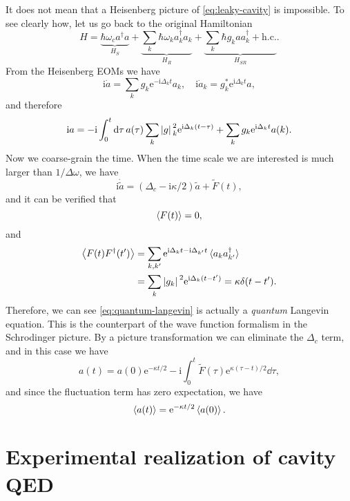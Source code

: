 \documentclass[hyperref, a4paper]{article}
\newcommand*{\ii}{\mathrm{i}}
\newcommand*{\ee}{\mathrm{e}}
\begin{document}
It does not mean that a Heisenberg picture of \eqref{eq:leaky-cavity} is impossible. To see clearly how, 
let us go back to the original Hamiltonian 
\begin{equation}
    H = \underbrace{\hbar \omega_c a^\dagger a}_{H_S} + \underbrace{\sum_k \hbar \omega_k a^\dagger_k a_k}_{H_R} + \underbrace{\sum_k \hbar g_k a a_k^\dagger + \text{h.c.}}_{H_{SR}}.
\end{equation}
From the Heisenberg EOMs we have 
\[
    \ii \dot{a} = \sum_k g_k \ee^{- \ii \Delta_k t} a_k, \quad \ii \dot{a}_k = g_k^* \ee^{\ii \Delta_k t} a,
\]
and therefore 
\[
    \ii a = - \ii \int_0^t \dd{\tau} a(\tau) \sum_k \abs*{g}_k^2 \ee^{\ii \Delta_k (t - \tau)}
    + \sum_k g_k \ee^{\ii \Delta_k t} a(k).
\]
Now we coarse-grain the time. When the time scale we are interested is much larger than $1 / \Delta \omega$,
we have 
\begin{equation}
    \ii \dot{\tilde{a}} = (\Delta_c - \ii \kappa / 2) \tilde{a} + \tilde{F}(t),
    \label{eq:quantum-langevin}
\end{equation}
and it can be verified that 
\begin{equation}
    \expval{F(t)} = 0, 
\end{equation}
and 
\begin{equation}
    \begin{aligned}
        \expval{F(t) F^\dagger(t')} &= \sum_{k, k'} \ee^{\ii \Delta_k t - \ii \Delta_{k'} t} \expval*{a_k a^\dagger_{k'}} \\
        &= \sum_k \abs*{g_k}^2 \ee^{\ii \Delta_k (t - t')} = \kappa \delta(t - t').
    \end{aligned}
\end{equation}
Therefore, we can see \eqref{eq:quantum-langevin} is actually a \emph{quantum} Langevin equation.
This is the counterpart of the wave function formalism in the Schrodinger picture.
By a picture transformation we can eliminate the $\Delta_c$ term, and in this case we have 
\begin{equation}
    a(t) = a(0) \ee^{- \kappa t / 2} - \ii \int_0^t \tilde{F}(\tau) \ee^{\kappa (\tau - t) / 2} \dd{\tau},
\end{equation}
and since the fluctuation term has zero expectation, we have  
\begin{equation}
    \expval{a(t)} = \ee^{- \kappa t / 2} \expval{a(0)}.
\end{equation}

\section{Experimental realization of cavity QED}
\end{document}
